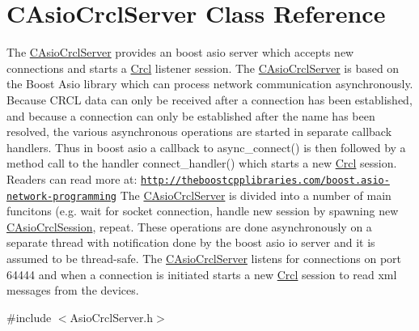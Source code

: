 \hypertarget{classCAsioCrclServer}{\section{C\-Asio\-Crcl\-Server Class Reference}
\label{classCAsioCrclServer}
}


The \hyperlink{classCAsioCrclServer}{C\-Asio\-Crcl\-Server} provides an boost asio server which accepts new connections and starts a \hyperlink{namespaceCrcl}{Crcl} listener session. The \hyperlink{classCAsioCrclServer}{C\-Asio\-Crcl\-Server} is based on the Boost Asio library which can process network communication asynchronously. Because C\-R\-C\-L data can only be received after a connection has been established, and because a connection can only be established after the name has been resolved, the various asynchronous operations are started in separate callback handlers. Thus in boost asio a callback to async\-\_\-connect() is then followed by a method call to the handler connect\-\_\-handler() which starts a new \hyperlink{namespaceCrcl}{Crcl} session. Readers can read more at\-: \href{http://theboostcpplibraries.com/boost.asio-network-programming}{\tt http\-://theboostcpplibraries.\-com/boost.\-asio-\/network-\/programming} The \hyperlink{classCAsioCrclServer}{C\-Asio\-Crcl\-Server} is divided into a number of main funcitons (e.\-g. wait for socket connection, handle new session by spawning new \hyperlink{classCAsioCrclSession}{C\-Asio\-Crcl\-Session}, repeat. These operations are done asynchronously on a separate thread with notification done by the boost asio io server and it is assumed to be thread-\/safe. The \hyperlink{classCAsioCrclServer}{C\-Asio\-Crcl\-Server} listens for connections on port 64444 and when a connection is initiated starts a new \hyperlink{namespaceCrcl}{Crcl} session to read xml messages from the devices.  




{\ttfamily \#include $<$Asio\-Crcl\-Server.\-h$>$}

